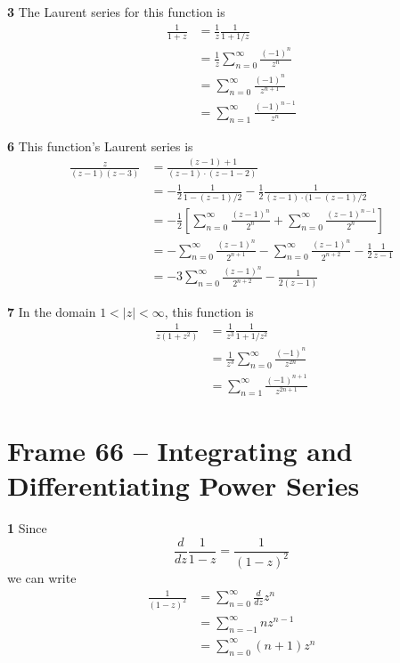 \documentclass{article}
\begin{document}
\textbf{3}
The Laurent series for this function is
\begin{align*}
	\frac{1}{1 + z}
	&= \frac{1}{z} \frac{1}{1 + 1/z} \\
	&= \frac{1}{z} \sum_{n=0}^\infty \frac{(-1)^n}{z^n} \\
	&= \sum_{n=0}^\infty \frac{(-1)^n}{z^{n+1}} \\
	&= \sum_{n=1}^\infty \frac{(-1)^{n-1}}{z^n}
\end{align*}

\textbf{6}
This function's Laurent series is
\begin{align*}
	\frac{z}{(z-1)(z-3)}
	&= \frac{(z-1) + 1}{(z-1) \cdot (z-1 - 2)} \\
	&= -\frac{1}{2} \frac{1}{1 - (z-1)/2} - \frac{1}{2} \frac{1}{(z-1) \cdot (1 - (z-1)/2} \\
	&= -\frac{1}{2} \left[ \sum_{n=0}^\infty \frac{(z-1)^n}{2^n} + \sum_{n=0}^\infty \frac{(z-1)^{n-1}}{2^n} \right] \\
	&= - \sum_{n=0}^\infty \frac{(z-1)^n}{2^{n+1}} - \sum_{n=0}^\infty \frac{(z-1)^n}{2^{n+2}} - \frac{1}{2} \frac{1}{z-1} \\
	&= -3 \sum_{n=0}^\infty \frac{(z-1)^n}{2^{n+2}} - \frac{1}{2(z-1)}
\end{align*}

\textbf{7}
In the domain $1 < |z| < \infty$, this function is
\begin{align*}
	\frac{1}{z(1 + z^2)}
	&= \frac{1}{z^3} \frac{1}{1 + 1/z^2} \\
	&= \frac{1}{z^3} \sum_{n=0}^\infty \frac{(-1)^n}{z^{2n}} \\
	&= \sum_{n=1}^\infty \frac{(-1)^{n+1}}{z^{2n+1}}
\end{align*}


\clearpage
\section{Frame 66 -- Integrating and Differentiating Power Series}
\textbf{1}
Since
\[
	\frac{d}{dz} \frac{1}{1 - z} = \frac{1}{(1 - z)^2}
\]
we can write
\begin{align*}
	\frac{1}{(1 - z)^2} 
	&= \sum_{n=0}^\infty \frac{d}{dz} z^{n} \\
	&= \sum_{n=-1}^\infty nz^{n-1} \\
	&= \sum_{n=0}^\infty (n+1)z^n
\end{align*}
\end{document}
